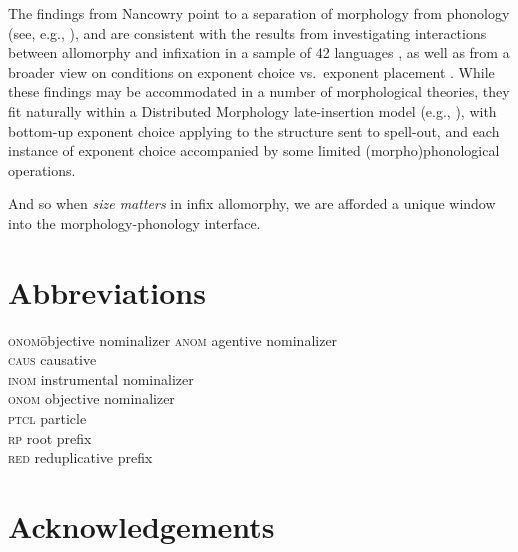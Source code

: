 \documentclass[output=paper]{langscibook}
\begin{document}
The findings from Nancowry point to a separation of morphology from phonology (see, e.g.,  \citealt{Trommer01,Paster06,Yu07,Embick10,BS12,Pak16,Dawson17,Kalin20,Rolle20,Stanton20}), and are consistent with the results from investigating interactions between allomorphy and infixation in a sample of 42 languages \citep{KalinIP}, as well as from a broader view on conditions on exponent choice vs.\ exponent placement \citep{KalinRolle21}. While these findings may be accommodated in a number of morphological theories, they fit naturally within a Distributed Morphology late-insertion model (e.g., \citealt{HalleMarantz93,HalleMarantz94,Embick10}), with bottom-up exponent choice applying to the structure sent to spell-out, and each instance of exponent choice accompanied by some limited (morpho)phonological operations.

And so when \textit{size matters} in infix allomorphy, we are afforded a unique window into the morphology-phonology interface.



\section*{Abbreviations}
\begin{multicols}{2}
\begin{tabbing}
\textsc{onom}\hspace{1ex}\= objective nominalizer\kill
\textsc{anom} \> agentive nominalizer \\
\textsc{caus} \> causative \\
\textsc{inom} \> instrumental nominalizer\\
\textsc{onom} \> objective nominalizer\\
\textsc{ptcl} \> particle\\
\textsc{rp}   \> root prefix\\
\textsc{red}  \> reduplicative prefix\\
\end{tabbing}
\end{multicols}

\section*{Acknowledgements}
\end{document}
